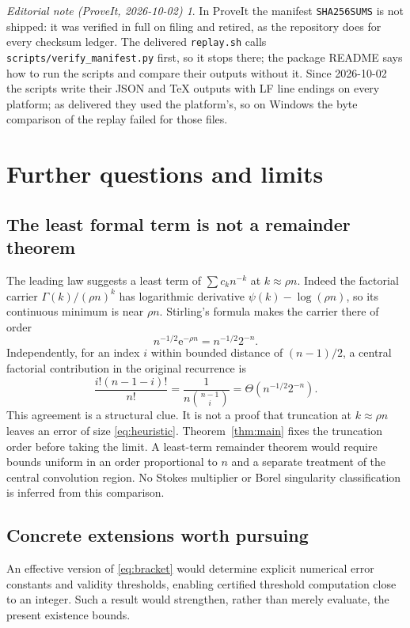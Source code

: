 \documentclass[11pt,letterpaper]{article}
\numberwithin{equation}{section}
\theoremstyle{remark}\newtheorem{remark}[theorem]{Remark}
\newtheorem*{ednote}{Editorial note (ProveIt, 2026-10-02)}
\newcommand{\e}{\mathrm e}
\begin{document}
\begin{ednote}
In ProveIt the manifest \texttt{SHA256SUMS} is not shipped: it was verified in full on filing and retired, as the repository does for every checksum ledger. The delivered \texttt{replay.sh} calls \texttt{scripts/verify\_manifest.py} first, so it stops there; the package README says how to run the scripts and compare their outputs without it. Since 2026-10-02 the scripts write their JSON and \TeX{} outputs with LF line endings on every platform; as delivered they used the platform's, so on Windows the byte comparison of the replay failed for those files.
\end{ednote}

\section{Further questions and limits}
\label{sec:questions}
\subsection{The least formal term is not a remainder theorem}
The leading law suggests a least term of $\sum c_k n^{-k}$ at $k\approx\rho n$. Indeed the factorial carrier $\Gamma(k)/(\rho n)^k$ has logarithmic derivative $\psi(k)-\log(\rho n)$, so its continuous minimum is near $\rho n$. Stirling's formula makes the carrier there of order
\begin{equation}\label{eq:heuristic}
 n^{-1/2}\e^{-\rho n}=n^{-1/2}2^{-n}.
\end{equation}
Independently, for an index $i$ within bounded distance of $(n-1)/2$, a central factorial contribution in the original recurrence is
\[
 \frac{i!(n-1-i)!}{n!}
 =\frac1{n\binom{n-1}{i}}
 =\Theta(n^{-1/2}2^{-n}).
\]
This agreement is a structural clue. It is not a proof that truncation at $k\approx\rho n$ leaves an error of size \eqref{eq:heuristic}. Theorem~\ref{thm:main} fixes the truncation order before taking the limit. A least-term remainder theorem would require bounds uniform in an order proportional to $n$ and a separate treatment of the central convolution region. No Stokes multiplier or Borel singularity classification is inferred from this comparison.

\subsection{Concrete extensions worth pursuing}
An effective version of \eqref{eq:bracket} would determine explicit numerical error constants and validity thresholds, enabling certified threshold computation close to an integer. Such a result would strengthen, rather than merely evaluate, the present existence bounds.
\end{document}
